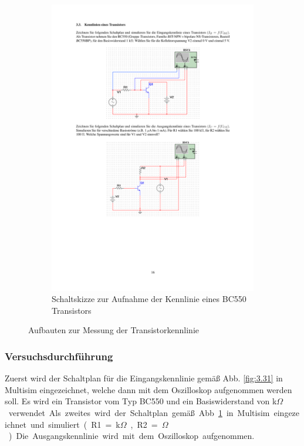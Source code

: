 \documentclass[12pt,a4paper]{article}
\begin{document}
\begin{figure}[H]
\begin{subfigure}[t]{0.48\textwidth}
                \includegraphics[trim = 30mm 75mm 30mm 140mm, clip, scale = 0.7]{ep5_14[Page16].pdf}
  				\caption[Schaltskizze zur Aufnahme der Augangskennlinie eines BC550 Transistors]{Schaltskizze zur Aufnahme der Kennlinie eines BC550 Transistors\footnotemark}
  				\label{fig:3.32}
        \end{subfigure}
        \caption{Aufbauten zur Messung der Transistorkennlinie}
        \label{fig:3.3}
\end{figure}


\subsubsection{Versuchsdurchführung}
Zuerst wird der Schaltplan für die Eingangskennlinie gemäß Abb. \ref{fig:3.31} in Multisim eingezeichnet, welche dann mit dem Oszilloskop aufgenommen werden soll. Es wird ein Transistor vom Typ  BC550 und ein Basiswiderstand von \unit[1]{k$\Omega$} verwendet. Als zweites wird der Schaltplan gemäß Abb. \ref{fig:3.32} in Multisim eingezeichnet und simuliert.(R1 = \unit[100]{k$\Omega$}, R2 = \unit[100]{$\Omega$})
Die Ausgangskennlinie wird mit dem Oszilloskop aufgenommen.
\end{document}
